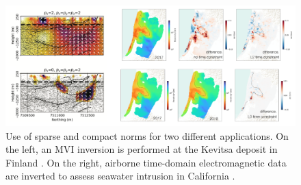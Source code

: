 \begin{figure}[!htb]
    \begin{center}
    \includegraphics[width=1\textwidth]{figures/sparse-compact-norms.png}
    \end{center}
\caption{
    Use of sparse and compact norms for two different applications. On the left, an MVI inversion is performed at the Kevitsa deposit in Finland \citep{fournier_sparse_2020}.  On the right, airborne time-domain electromagnetic data are inverted to assess seawater intrusion in California \citep{kang_time-lapse_2022}.
}
\label{fig:sparse-compact-norms}
\end{figure}
